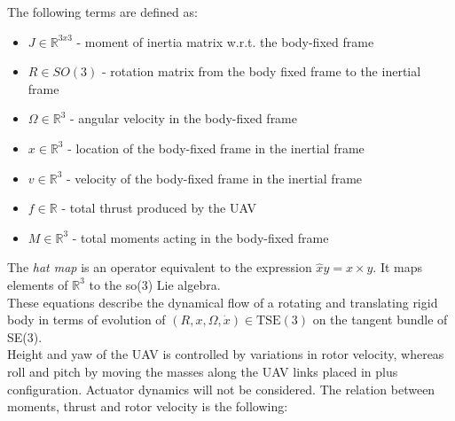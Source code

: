 \noindent The following terms are defined as:

\begin{itemize}
	\item $J \in \mathbb{R}^{3x3}$ - moment of inertia matrix w.r.t. the body-fixed frame 
	
	\item $R \in SO(3)$ - rotation matrix from the body fixed frame to the inertial frame
	
	\item $\Omega \in \mathbb{R}^3$ - angular velocity in the body-fixed frame
	
	\item $x \in \mathbb{R}^3$ - location of the body-fixed frame in the inertial frame
	
	\item $v \in \mathbb{R}^3$ - velocity of the body-fixed frame in the inertial frame
	
	\item $f \in \mathbb{R}$ - total thrust produced by the UAV
	
	\item $M \in \mathbb{R}^3$ - total moments acting in the body-fixed frame
\end{itemize}

\noindent The \textit{hat map} is an operator equivalent to the expression $\hat{x}y = x \times y$. It maps elements of $\mathbb{R}^3$ to the so(3) Lie algebra. \\
\indent These equations describe the dynamical flow of a rotating and translating rigid body in terms of evolution of $(R,x,\Omega,\dot{x})\in \text{TSE}(3)$ on the tangent bundle of SE(3). \\
\indent Height and yaw of the UAV is controlled by variations in rotor velocity, whereas roll and pitch by moving the masses along the UAV links placed in plus configuration. Actuator dynamics will not be considered. The relation between moments, thrust and rotor velocity is the following:

